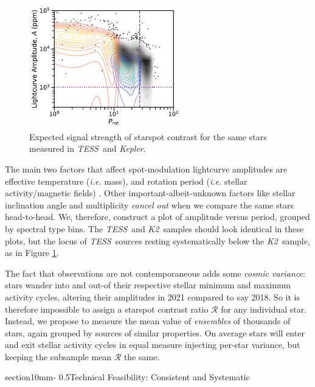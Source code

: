 \documentclass[letterpaper,12pt]{article}
\makeatletter
\renewcommand{\section}{\@startsection%
{section}{1}{0mm}{-\baselineskip}%
{0.5\baselineskip}{\normalfont\Large\bfseries}}%
\newcommand{\tess}{{\it TESS}}
\newcommand{\kepler}{{\it Kepler}}
\newcommand{\ktwo}{{\it K2}}
\makeatother
\begin{document}
\begin{figure}
    \vspace{0mm}
    \begin{center}
    \includegraphics[width=2.6in]{figures/fig1.pdf}
    \caption{Expected signal strength of starspot contrast for the same stars measured in \tess\ and \kepler. }
    \label{fig:expected}
    \vspace{0mm}
\end{center}
\end{figure}


The main two factors that affect spot-modulation lightcurve amplitudes are effective temperature (\emph{i.e.} mass), and rotation period (\emph{i.e.} stellar activity/magnetic fields) \cite{2014ApJS..211...24M}.  Other important-albeit-unknown factors like stellar inclination angle and multiplicity \emph{cancel out} when we compare the same stars head-to-head.  We, therefore, construct a plot of amplitude versus period, grouped by spectral type bins.  The \tess\ and \ktwo\ samples should look identical in these plots, but the locus of \tess\ sources resting systematically below the \ktwo\ sample, as in Figure \ref{fig:expected}.


The fact that observations are not contemporaneous adds some \emph{cosmic variance}: stars wander into and out-of their respective stellar minimum and maximum activity cycles, altering their amplitudes in 2021 compared to say 2018. So it is therefore impossible to assign a starspot contrast ratio $\mathcal{R}$ for any individual star.  Instead, we propose to measure the mean value of \emph{ensembles} of thousands of stars, again grouped by sources of similar properties.  On average stars will enter and exit stellar activity cycles in equal measure injecting per-star variance, but keeping the subsample mean $\mathcal{R}$ the same.

\section{Technical Feasibility: Consistent and Systematic}
\end{document}
